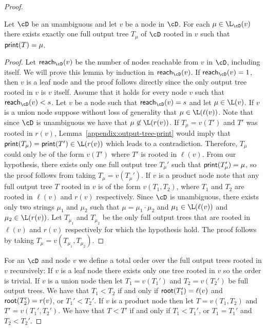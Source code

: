 \begin{proof}
	\begin{lemma}\label{appendix:output-tree-unique}
		Let $\cD$ be an unambiguous \dsabbr and let $v$ be a node in $\cD$. For each $\mu\in\L_{\cD}(v)$ there exists exactly one full output tree $T_{\mu}$ of $\cD$ rooted in $v$ such that ${\sf print}(T) = \mu$.
	\end{lemma}
	\begin{proof}
		Let ${\sf reach_{\cD}}(v)$ be the number of nodes reachable from $v$ in $\cD$, including itself. We will prove this lemma by induction in ${\sf reach_{\cD}}(v)$. If ${\sf reach_{\cD}}(v) = 1$, then $v$ is a leaf node and the proof follows directly since the only output tree rooted in $v$ is $v$ itself. Assume that it holds for every node $v$ such that ${\sf reach_{\cD}}(v)< s$. Let $v$ be a node such that ${\sf reach_{\cD}}(v) = s$ and let $\mu\in\L(v)$. If $v$ is a union node suppose without loss of generality that $\mu\in\L(\ell(v))$. Note that since $\cD$ is unambiguous we have that $\mu\not\in\L(r(v))$. If $T_{\mu} = v(T')$ and $T'$ was rooted in $r(v)$, Lemma~\ref{appendix:output-tree-print} would imply that ${\sf print}(T_{\mu}) = {\sf print}(T') \in \L(r(v))$ which leads to a contradiction. Therefore, $T_{\mu}$ could only be of the form $v(T')$ where $T'$ is rooted in $\ell(v)$. From our hypothesis, there exists only one full output tree $T_{\mu}'$ such that ${\sf print}(T_{\mu}') = \mu$, so the proof follows from taking $T_{\mu} = v(T_{\mu}')$. If $v$ is a product node note that any full output tree $T$ rooted in $v$ is of the form $v(T_1,T_2)$, where $T_1$ and $T_2$ are rooted in $\ell(v)$ and $r(v)$ respectively. Since $\cD$ is unambiguous, there exists only two strings $\mu_1$ and $\mu_2$ such that $\mu = \mu_1\cdot\mu_2$ and $\mu_1\in\L(\ell(v))$ and $\mu_2\in\L(r(v))$. Let $T_{\mu_1}$ and $T_{\mu_2}$ be the only full output trees that are rooted in $\ell(v)$ and $r(v)$ respectively for which the hypothesis hold. The proof follows by taking $T_{\mu} = v(T_{\mu_1},T_{\mu_2})$.
	\end{proof} 
	
	For an \dsabbr $\cD$ and node $v$ we define a total order over the full output trees rooted in $v$ recursively: If $v$ is a leaf node there exists only one tree rooted in $v$ so the order is trivial. If $v$ is a union node then let $T_1 = v(T_1')$ and $T_2 = v(T_2')$ be full output trees. We have that $T_1 < T_2$ if and only if ${\sf root}(T_1') = \ell(v)$ and ${\sf root}(T_2') = r(v)$, or $T_1' < T_2'$. If $v$ is a product node then let $T = v(T_1,T_2)$ and $T' = v(T_1',T_2')$. We have that $T < T'$ if and only if $T_1 < T_1'$, or $T_1 = T_1'$ and $T_2 < T_2'$.
	

\end{proof}
